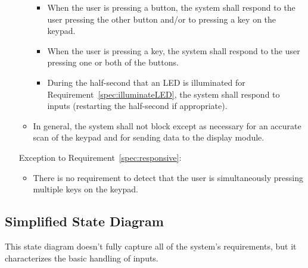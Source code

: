 \begin{enumerate}
\begin{itemize}
\begin{itemize}
                    \item When the user is pressing a button, the system shall respond to the user pressing the other button and/or to pressing a key on the keypad.
                    \item When the user is pressing a key, the system shall respond to the user pressing one or both of the buttons.
                    \item During the half-second that an LED is illuminated for Requirement~\ref{spec:illuminateLED}, the system shall respond to inputs (restarting the half-second if appropriate).
                \end{itemize}
            \item In general, the system shall not block except as necessary for an accurate scan of the keypad and for sending data to the display module.
        \end{itemize}
        Exception to Requirement~\ref{spec:responsive}:
        \begin{itemize}
            \item There is no requirement to detect that the user is simultaneously pressing multiple keys on the keypad.
        \end{itemize}
\end{enumerate}


\subsection{Simplified State Diagram}

This state diagram doesn't fully capture all of the system's requirements,
but it characterizes the basic handling of inputs.

